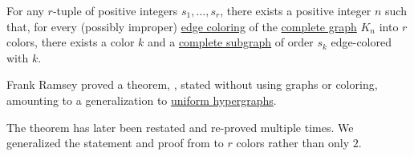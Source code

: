 \begin{theorem}\label{thm:ramseys_theorem}
  For any \( r \)-tuple of positive integers \( s_1, \ldots, s_r \), there exists a positive integer \( n \) such that, for every (possibly improper) \hyperref[def:graph_coloring]{edge coloring} of the \hyperref[def:complete_graph]{complete graph} \( K_n \) into \( r \) colors, there exists a color \( k \) and a \hyperref[def:complete_subgraph]{complete subgraph} of order \( s_k \) edge-colored with \( k \).
\end{theorem}
\begin{comments}
  \item Frank Ramsey proved a theorem, \cite[thm. B]{Ramsey1930FormulaConsistency}, stated without using graphs or coloring, amounting to a generalization to \hyperref[def:hypergraph/uniform]{uniform hypergraphs}.

  The theorem has later been restated and re-proved multiple times. We generalized the statement and proof from \cite[thm. VI.1]{Bollobás1998ModernGraphTheory} to \( r \) colors rather than only \( 2 \).
\end{comments}
